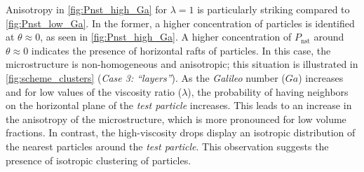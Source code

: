 \documentclass[11pt]{My_preprint}
\begin{document}
Anisotropy in \ref{fig:Pnst_high_Ga} for $\lambda=1$ is particularly striking compared to \ref{fig:Pnst_low_Ga}. 
In the former, a higher concentration of particles is identified at $\theta \approx 0$, as seen in \ref{fig:Pnst_high_Ga}. 
A higher concentration of $P_\text{nst}$ around $\theta \approx 0$ indicates the presence of horizontal rafts of particles. 
In this case, the microstructure is non-homogeneous and anisotropic; this situation is illustrated in \ref{fig:scheme_clusters} (\textit{Case 3: ``layers''}). 
As the \textit{Galileo} number ($Ga$) increases and for low values of the viscosity ratio ($\lambda$), the probability of having neighbors on the horizontal plane of the \textit{test particle} increases. 
This leads to an increase in the anisotropy of the microstructure, which is more pronounced for low volume fractions. 
In contrast, the high-viscosity drops display an isotropic distribution of the nearest particles around the \textit{test particle}. 
This observation suggests the presence of isotropic clustering of particles.
\end{document}
